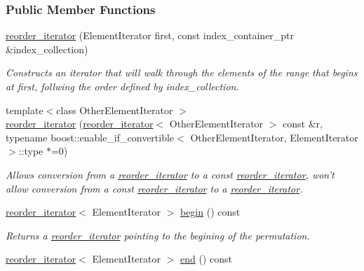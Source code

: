 \subsubsection*{Public Member Functions}
\begin{DoxyCompactItemize}
\item 
\hypertarget{classtrsl_1_1reorder__iterator_ae62a06846acf8580b22667dff10a9077}{
\hyperlink{classtrsl_1_1reorder__iterator_ae62a06846acf8580b22667dff10a9077}{reorder\_\-iterator} (ElementIterator first, const index\_\-container\_\-ptr \&index\_\-collection)}
\label{classtrsl_1_1reorder__iterator_ae62a06846acf8580b22667dff10a9077}

\begin{DoxyCompactList}\small\item\em Constructs an iterator that will walk through the elements of the range that begins at {\ttfamily first}, follwing the order defined by {\ttfamily index\_\-collection}. \item\end{DoxyCompactList}\item 
{\footnotesize template$<$class OtherElementIterator $>$ }\\\hyperlink{classtrsl_1_1reorder__iterator_a340ad08bd47c8c21ec094a6996652e0e}{reorder\_\-iterator} (\hyperlink{classtrsl_1_1reorder__iterator}{reorder\_\-iterator}$<$ OtherElementIterator $>$ const \&r, typename boost::enable\_\-if\_\-convertible$<$ OtherElementIterator, ElementIterator $>$::type $\ast$=0)
\begin{DoxyCompactList}\small\item\em Allows conversion from a \hyperlink{classtrsl_1_1reorder__iterator}{reorder\_\-iterator} to a const \hyperlink{classtrsl_1_1reorder__iterator}{reorder\_\-iterator}, won't allow conversion from a const \hyperlink{classtrsl_1_1reorder__iterator}{reorder\_\-iterator} to a \hyperlink{classtrsl_1_1reorder__iterator}{reorder\_\-iterator}. \item\end{DoxyCompactList}\item 
\hypertarget{classtrsl_1_1reorder__iterator_af8f78e62dfc60bdfb2b21e2c5632d295}{
\hyperlink{classtrsl_1_1reorder__iterator}{reorder\_\-iterator}$<$ ElementIterator $>$ \hyperlink{classtrsl_1_1reorder__iterator_af8f78e62dfc60bdfb2b21e2c5632d295}{begin} () const }
\label{classtrsl_1_1reorder__iterator_af8f78e62dfc60bdfb2b21e2c5632d295}

\begin{DoxyCompactList}\small\item\em Returns a \hyperlink{classtrsl_1_1reorder__iterator}{reorder\_\-iterator} pointing to the begining of the permutation. \item\end{DoxyCompactList}\item 
\hypertarget{classtrsl_1_1reorder__iterator_a34cefcb91f1ea859ea6a23223ca13e1b}{
\hyperlink{classtrsl_1_1reorder__iterator}{reorder\_\-iterator}$<$ ElementIterator $>$ \hyperlink{classtrsl_1_1reorder__iterator_a34cefcb91f1ea859ea6a23223ca13e1b}{end} () const }
\label{classtrsl_1_1reorder__iterator_a34cefcb91f1ea859ea6a23223ca13e1b}


\end{DoxyCompactItemize}
